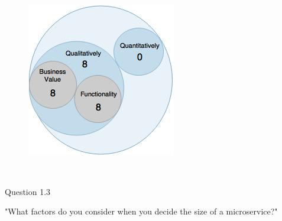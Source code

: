 \\
\begin{figure}[H]
\begin{center}
\includegraphics[scale=0.5]{figures/question1_2}
\label{fig:hybris_architecture/interview/question1-2}
\end{center}
\end{figure}
\\

\begin{shaded} Question 1.3 \end{shaded} \label{question:hybris_architecture/interview/question_1.3}
"What factors do you consider when you decide the size of a microservice?"\\

